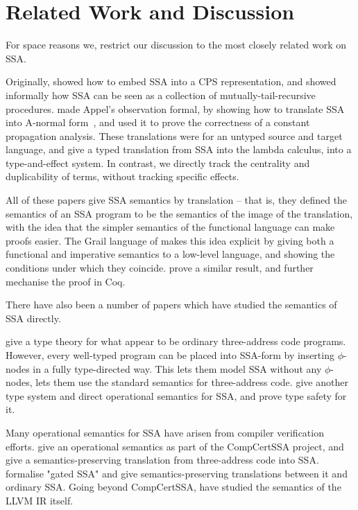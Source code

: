 \documentclass[acmsmall,screen,review]{acmart}
\begin{document}
\section{Related Work and Discussion}

For space reasons we, restrict our discussion to the most closely related work
on SSA. 

Originally, \citet{kelsey-ssa-cps} showed how to embed SSA into a CPS
representation, and \citet{appel-ssa} showed informally how SSA can be seen as a
collection of mutually-tail-recursive procedures.
\citet{chakravarty-functional-ssa-2003} made Appel's observation formal, by
showing how to translate SSA into A-normal form~\cite{anf}, and used it to prove
the correctness of a constant propagation analysis. These translations were for
an untyped source and target language, and
\citet{typed-effect-ssa-rigon-torrens-vasconcellos-20} give a typed translation
from SSA into the lambda calculus, into a type-and-effect system. In contrast,
we directly track the centrality and duplicability of terms, without tracking
specific effects.

All of these papers give SSA semantics by translation -- that is, they defined
the semantics of an SSA program to be the semantics of the image of the
translation, with the idea that the simpler semantics of the functional language
can make proofs easier. The Grail language of \citet{beringer-imp-fun} makes
this idea explicit by giving both a functional and imperative semantics to a
low-level language, and showing the conditions under which they coincide.
\citet{schneider-imp-fun} prove a similar result, and further mechanise the
proof in Coq.

There have also been a number of papers which have studied the semantics of SSA
directly.

\citet{ssa-types-matsuno-ohori-06} give a type theory for what appear to be
ordinary three-address code programs. However, every well-typed program can be
placed into SSA-form by inserting $\phi$-nodes in a fully type-directed way.
This lets them model SSA without any $\phi$-nodes, lets them use the standard
semantics for three-address code.
%
\citet{hua-explicit-ssa-2010} give another type system and direct operational
semantics for SSA, and prove type safety for it. 

Many operational semantics for SSA have arisen from compiler verification
efforts. \citet{barthe-compcert-ssa-2014} give an operational semantics as part
of the CompCertSSA project, and give a semantics-preserving translation from
three-address code into SSA. \citet{herklotz-gsa-2023} formalise "gated SSA" and
give semantics-preserving translations between it and ordinary SSA. Going beyond
CompCertSSA, \citet{vellum} have studied the semantics of the LLVM IR itself.
\end{document}
